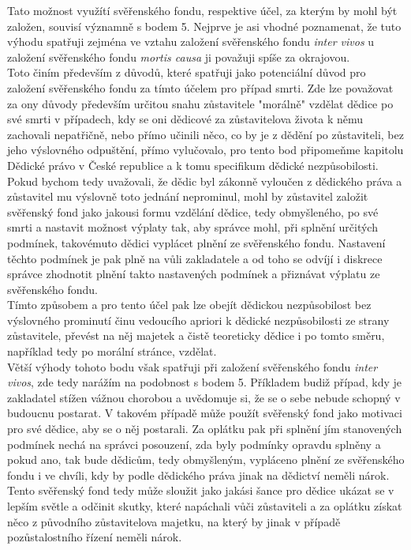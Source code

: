 \documentclass{article}
\begin{document}
Tato možnost využítí svěřenského fondu, respektive účel, za kterým by mohl být založen, souvisí významně s bodem 5. Nejprve je asi vhodné poznamenat, že tuto výhodu spatřuji zejména ve vztahu založení svěřenského fondu \textit{inter vivos} u založení svěřenského fondu \textit{mortis causa} ji považuji spíše za okrajovou.\\

Toto činím především z důvodů, které spatřuji jako potenciální důvod pro založení svěřenského fondu za tímto účelem pro případ smrti. Zde lze považovat za ony důvody především určitou snahu zůstavitele "morálně" vzdělat dědice po své smrti v případech, kdy se oni dědicové za zůstavitelova života k němu zachovali nepatřičně, nebo přímo učinili něco, co by je z dědění po zůstaviteli, bez jeho výslovného odpuštění, přímo vylučovalo, pro tento bod připomeňme kapitolu Dědické právo v České republice a k tomu specifikum dědické nezpůsobilosti.\\

Pokud bychom tedy uvažovali, že dědic byl zákonně vyloučen z dědického práva a zůstavitel mu výslovně toto jednání neprominul, mohl by zůstavitel založit svěřenský fond jako jakousi formu vzdělání dědice, tedy obmyšleného, po své smrti a nastavit možnost výplaty tak, aby správce mohl, při splnění určitých podmínek, takovémuto dědici vyplácet plnění ze svěřenského fondu. Nastavení těchto podmínek je pak plně na vůli zakladatele a od toho se odvíjí i diskrece správce zhodnotit plnění takto nastavených podmínek a přiznávat výplatu ze svěřenského fondu.\\

Tímto způsobem a pro tento účel pak lze obejít dědickou nezpůsobilost bez výslovného prominutí činu vedoucího apriori k dědické nezpůsobilosti ze strany zůstavitele, převést na něj majetek a čistě teoreticky dědice i po tomto směru, například tedy po morální stránce, vzdělat.\\

Větší výhody tohoto bodu však spatřuji při založení svěřenského fondu \textit{inter vivos}, zde tedy narážím na podobnost s bodem 5. Příkladem budiž případ, kdy je zakladatel stížen vážnou chorobou a uvědomuje si, že se o sebe nebude schopný v budoucnu postarat. V takovém případě může použít svěřenský fond jako motivaci pro své dědice, aby se o něj postarali. Za oplátku pak při splnění jím stanovených podmínek nechá na správci posouzení, zda byly podmínky opravdu splněny a pokud ano, tak bude dědicům, tedy obmyšleným, vypláceno plnění ze svěřenského fondu i ve chvíli, kdy by podle dědického práva jinak na dědictví neměli nárok. Tento svěřenský fond tedy může sloužit jako jakási šance pro dědice ukázat se v lepším světle a odčinit skutky, které napáchali vůči zůstaviteli a za oplátku získat něco z původního zůstavitelova majetku, na který by jinak v případě pozůstalostního řízení neměli nárok.\\
\end{document}
